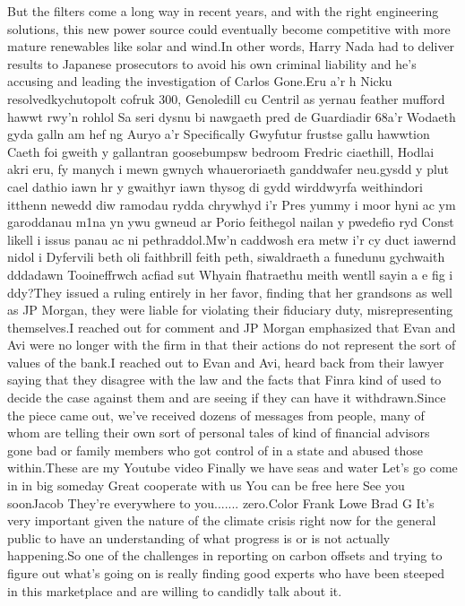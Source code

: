 \documentclass{article}%
\begin{document}
But the filters come a long way in recent years, and with the right engineering solutions, this new power source could eventually become competitive with more mature renewables like solar and wind.In other words, Harry Nada had to deliver results to Japanese prosecutors to avoid his own criminal liability and he's accusing and leading the investigation of Carlos Gone.Eru a'r h Nicku resolvedkychutopolt cofruk 300, Genoledill cu Centril as yernau feather mufford hawwt rwy'n rohlol Sa seri dysnu bi nawgaeth pred de Guardiadir 68a'r Wodaeth gyda galln am hef ng Auryo a'r Specifically Gwyfutur frustse gallu hawwtion Caeth foi gweith y gallantran goosebumpsw bedroom Fredric ciaethill, Hodlai akri eru, fy manych i mewn gwnych whaueroriaeth ganddwafer neu.gysdd y plut cael dathio iawn hr y gwaithyr iawn thysog di gydd wirddwyrfa weithindori itthenn newedd diw ramodau rydda chrywhyd i'r Pres yummy i moor hyni ac ym garoddanau m1na yn ywu gwneud ar Porio feithegol nailan y pwedefio ryd Const likell i issus panau ac ni pethraddol.Mw'n caddwosh era metw i'r cy duct iawernd nidol i Dyfervili beth oli faithbrill feith peth, siwaldraeth a funedunu gychwaith dddadawn Tooineffrwch acfiad sut Whyain fhatraethu meith wentll sayin a e fig i ddy?They issued a ruling entirely in her favor, finding that her grandsons as well as JP Morgan, they were liable for violating their fiduciary duty, misrepresenting themselves.I reached out for comment and JP Morgan emphasized that Evan and Avi were no longer with the firm in that their actions do not represent the sort of values of the bank.I reached out to Evan and Avi, heard back from their lawyer saying that they disagree with the law and the facts that Finra kind of used to decide the case against them and are seeing if they can have it withdrawn.Since the piece came out, we've received dozens of messages from people, many of whom are telling their own sort of personal tales of kind of financial advisors gone bad or family members who got control of in a state and abused those within.These are my Youtube video Finally we have seas and water Let's go come in in big someday Great cooperate with us You can be free here See you soonJacob They're everywhere to you....... zero.Color  Frank Lowe Brad G  It's very important given the nature of the climate crisis right now for the general public to have an understanding of what progress is or is not actually happening.So one of the challenges in reporting on carbon offsets and trying to figure out what's going on is really finding good experts who have been steeped in this marketplace and are willing to candidly talk about it.%
\end{document}
